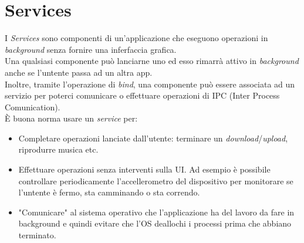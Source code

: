 \chapter{Services}

I \textit{Services} sono componenti di un'applicazione che eseguono operazioni in \textit{background} senza fornire una inferfaccia grafica. \\
Una qualsiasi componente può lanciarne uno ed esso rimarrà attivo in \textit{background} anche se l'untente passa ad un altra app.\\
Inoltre, tramite l'operazione di \textit{bind}, una componente può essere associata ad un servizio per poterci comunicare o effettuare operazioni di IPC (Inter Process Comunication).\\
È buona norma usare un \textit{service} per:
\begin{itemize}
	\item Completare operazioni lanciate dall'utente: terminare un \textit{download}/\textit{upload}, riprodurre musica etc.
	\item Effettuare operazioni senza interventi sulla UI. Ad esempio è possibile controllare periodicamente l'accellerometro del dispositivo per monitorare se l'untente è fermo, sta camminando o sta correndo.
	\item "Comunicare" al sistema operativo che l'applicazione ha del lavoro da fare in background e quindi evitare che l'OS deallochi i processi prima che abbiano terminato.
\end{itemize}

